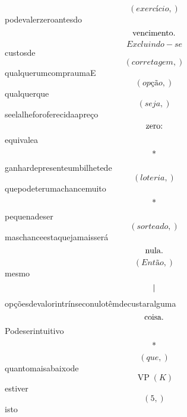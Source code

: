 \documentclass{article}
\begin{document}
\begin{equation}
\left( exercício,\right)
\end{equation}podevalerzeroantesdo\begin{equation}
$vencimento.$
\end{equation}\begin{equation}
Excluindo - se
\end{equation}custosde\begin{equation}
\left( corretagem,\right)
\end{equation}qualquerumcompraumaE\begin{equation}
\left( opção,\right)
\end{equation}qualquerque\begin{equation}
\left( seja,\right)
\end{equation}seelalheforoferecidaapreço\begin{equation}
$zero:$
\end{equation}equivalea\begin{equation}
$*$
\end{equation}ganhardepresenteumbilhetede\begin{equation}
\left( loteria,\right)
\end{equation}quepodeterumachancemuito\begin{equation}
$*$
\end{equation}pequenadeser\begin{equation}
\left( sorteado,\right)
\end{equation}maschanceestaquejamaisserá\begin{equation}
$nula.$
\end{equation}\begin{equation}
\left( Então,\right)
\end{equation}mesmo\begin{equation}
$|$
\end{equation}opçõesdevalorintrínseconulotêmdecustaralguma\begin{equation}
$coisa.$
\end{equation}Podeserintuitivo\begin{equation}
$*$
\end{equation}\begin{equation}
\left( que,\right)
\end{equation}quantomaisabaixode\begin{equation}
\operatorname{VP}{\left(K \right)}
\end{equation}estiver\begin{equation}
\left( 5,\right)
\end{equation}isto\begin{equation}

\end{equation}
\end{document}
